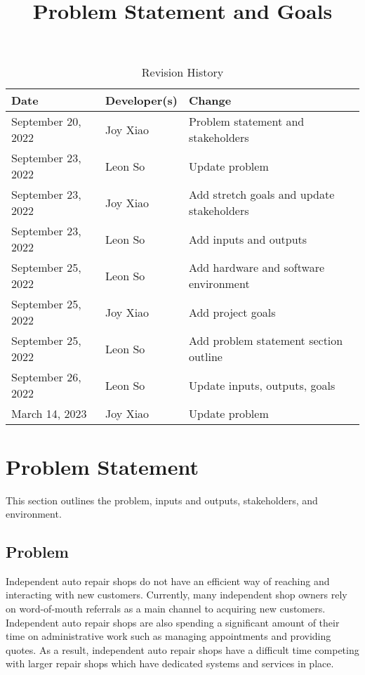 \documentclass{article}
\title{Problem Statement and Goals\\\progname}
\author{\authname}
\date{}
\begin{document}
\maketitle

\begin{table}[hp]
	\caption{Revision History} \label{TblRevisionHistory}
	\begin{tabularx}{\textwidth}{llX}
		\toprule
		\textbf{Date}      & \textbf{Developer(s)} & \textbf{Change}                           \\
		\midrule
		September 20, 2022 & Joy Xiao              & Problem statement and stakeholders        \\
		September 23, 2022 & Leon So               & Update problem                            \\
		September 23, 2022 & Joy Xiao              & Add stretch goals and update stakeholders \\
		September 23, 2022 & Leon So               & Add inputs and outputs                    \\
		September 25, 2022 & Leon So               & Add hardware and software environment     \\
		September 25, 2022 & Joy Xiao              & Add project goals                         \\
		September 25, 2022 & Leon So               & Add problem statement section outline     \\
		September 26, 2022 & Leon So               & Update inputs, outputs, goals             \\
		March 14, 2023     & Joy Xiao              & Update problem                            \\
		\bottomrule
	\end{tabularx}
\end{table}

\section{Problem Statement}
This section outlines the problem, inputs and outputs, stakeholders, and environment.

\subsection{Problem}
Independent auto repair shops do not have an efficient way of reaching and interacting with new
customers. Currently, many independent shop owners rely on word-of-mouth referrals as a main
channel to acquiring new customers. Independent auto repair shops are also spending a significant
amount of their time on administrative work such as managing appointments and providing quotes. As
a result, independent auto repair shops have a difficult time competing with larger repair shops
which have dedicated systems and services in place.\\
\end{document}
